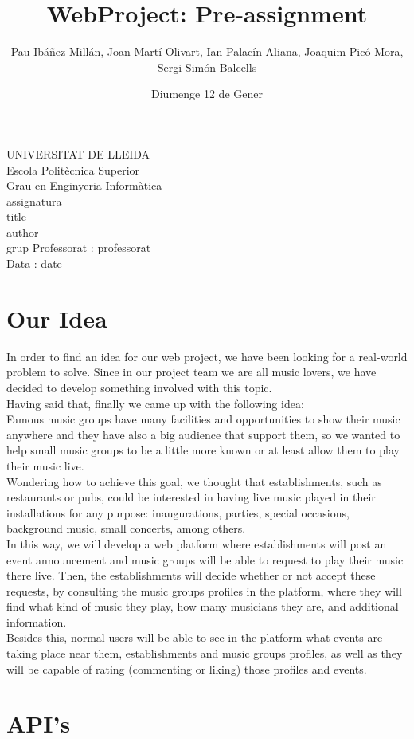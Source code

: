 \documentclass{article}
\title{WebProject: Pre-assignment}
\author{Pau Ibáñez Millán, Joan Martí Olivart, Ian Palacín Aliana, Joaquim Picó Mora, Sergi Simón Balcells}
\date{Diumenge 12 de Gener}
\renewcommand{\maketitle}{ %
    \begin{titlepage}
        \raggedright{UNIVERSITAT DE LLEIDA \\
            Escola Politècnica Superior \\
            Grau en Enginyeria Informàtica\\
            \1assignatura\\}
            \vspace{5cm}
            \centering\huge{\5title \\}
            \vspace{3cm}
            \large{\6author} \\
            \normalsize{\3grup}
            \vfill
            Professorat : \4professorat \\
            Data : \7date
\end{titlepage}}
\begin{document}
    \maketitle
    \thispagestyle{empty}
    
    \newpage
    \tableofcontents
    \newpage
    
\section{Our Idea}
In order to find an idea for our web project, we have been looking for a real-world problem to solve. Since in our project team we are all music lovers, we have decided to develop something involved with this topic. \\
Having said that, finally we came up with the following idea: \\
Famous music groups have many facilities and opportunities to show their music anywhere and they have also a big audience that support them, so we wanted to help small music groups to be a little more known or at least allow them to play their music live. \\
Wondering how to achieve this goal, we thought that establishments, such as restaurants or pubs, could be interested in having live music played in their installations for any purpose: inaugurations, parties, special occasions, background music, small concerts, among others. \\
In this way, we will develop a web platform where establishments will post an event announcement and music groups will be able to request to play their music there live. Then, the establishments will decide whether or not accept these requests, by consulting the music groups profiles in the platform, where they will find what kind of music they play, how many musicians they are, and additional information. \\
Besides this, normal users will be able to see in the platform what events are taking place near them, establishments and music groups profiles, as well as they will be capable of rating (commenting or liking) those profiles and events. \\

\section{API's}
\end{document}

